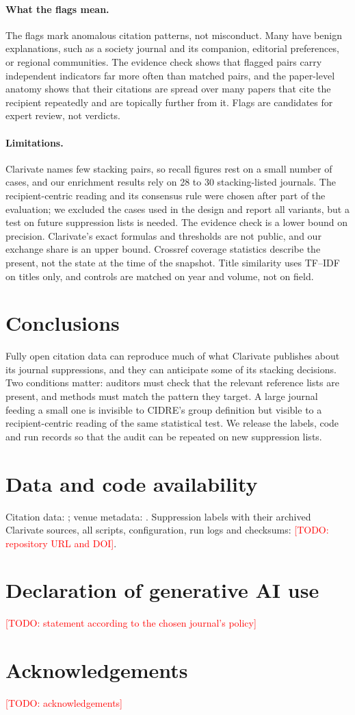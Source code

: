\documentclass[11pt]{article}
\newcommand{\todo}[1]{\textcolor{red}{[TODO: #1]}}
\begin{document}
\paragraph{What the flags mean.}
The flags mark anomalous citation patterns, not misconduct. Many have benign explanations, such as a society journal
and its companion, editorial preferences, or regional communities. The evidence check shows that flagged pairs carry
independent indicators far more often than matched pairs, and the paper-level anatomy shows that their citations are
spread over many papers that cite the recipient repeatedly and are topically further from it. Flags are candidates for
expert review, not verdicts.

\paragraph{Limitations.}
Clarivate names few stacking pairs, so recall figures rest on a small number of cases, and our enrichment results rely
on 28 to 30 stacking-listed journals. The recipient-centric reading and its consensus rule were chosen after part of
the evaluation; we excluded the cases used in the design and report all variants, but a test on future suppression
lists is needed. The evidence check is a lower bound on precision. Clarivate's exact formulas and thresholds are not
public, and our exchange share is an upper bound. Crossref coverage statistics describe the present, not the state at
the time of the snapshot. Title similarity uses TF--IDF on titles only, and controls are matched on year and volume,
not on field.

\section{Conclusions}\label{sec:conclusions}
Fully open citation data can reproduce much of what Clarivate publishes about its journal suppressions, and they can
anticipate some of its stacking decisions. Two conditions matter: auditors must check that the relevant reference
lists are present, and methods must match the pattern they target. A large journal feeding a small one is invisible to
CIDRE's group definition but visible to a recipient-centric reading of the same statistical test. We release the
labels, code and run records so that the audit can be repeated on new suppression lists.

\section*{Data and code availability}\label{sec:availability}
Citation data: \cite{arjomandi2024dataset}; venue metadata: \cite{ocmeta2024dump}. Suppression labels with their
archived Clarivate sources, all scripts, configuration, run logs and checksums: \todo{repository URL and DOI}.

\section*{Declaration of generative AI use}
\todo{statement according to the chosen journal's policy}

\section*{Acknowledgements}
\todo{acknowledgements}



\end{document}
